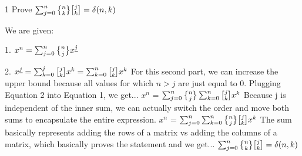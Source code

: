 \label{20-0319-1}
\begin{problem} 1 Prove $\sum_{j = 0}^n \stirii{n}{k}\stiri j k = \delta(n,k)$ \end{problem}

\begin{solution}
We are given:

1. $x^n = \sum_{j = 0}^n \stirii{n}{j} x^{\underline{j}}$

2. $x^{\underline{j}} = \sum_{k = 0}^j \stiri j k x^k = \sum_{k = 0}^n \stiri j k x^k$ 
\newline
For this second part, we can increase the upper bound because all values for which $n > j$ are just equal to 0.
\newline 
Plugging Equation 2 into Equation 1, we get...
\newline
$x^n$ = $\sum_{j = 0}^n \stirii{n}{j} \sum_{k = 0}^n \stiri j k x^k$
\newline
Because j is independent of the inner sum, we can actually switch the order and move both sums to encapsulate the entire expression.
\newline
$x^n$ = $\sum_{j = 0}^n \sum_{k = 0}^n \stirii{n}{j} \stiri j k x^k$
\newline
The sum basically represents adding the rows of a matrix vs adding the columns of a matrix, which basically proves the statement and we get...
$\sum_{j = 0}^n \stirii{n}{k} \stiri j k = \delta(n,k)$ 
\end{solution}